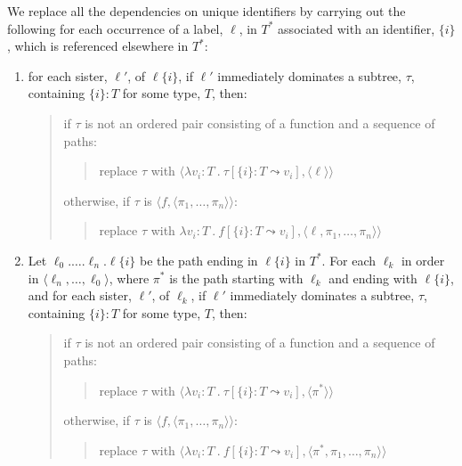 We replace all the dependencies on
unique identifiers by carrying out the
following for each occurrence of a label, $\ell$, in $T^*$ associated with
an identifier, $\{i\}$, which is referenced elsewhere in $T^*$:
\begin{enumerate} 
 
\item for each sister, $\ell'$, of $\ell\{i\}$, if $\ell'$ immediately
  dominates
  a subtree, $\tau$, containing $\{i\}\!:\!T$ for some type, $T$, then:
\begin{quote}
if $\tau$ is not an ordered pair consisting of a function and a
sequence of paths:
\begin{quote}
replace $\tau$ with $\langle\lambda v_i\!:\!T\ .\ \tau[\{i\}\!:\!T\leadsto v_i],\langle\ell\rangle\rangle$
\end{quote}
otherwise, if $\tau$ is $\langle f, \langle\pi_1,\ldots,\pi_n\rangle\rangle$:
\begin{quote}
replace $\tau$ with $\lambda v_i\!:\!T\ . \ f[\{i\}\!:\!T\leadsto v_i],
\langle\ell,\pi_1,\ldots,\pi_n\rangle\rangle$
\end{quote}
\end{quote}
 
\item Let $\ell_0.\ldots.\ell_n.\ell\{i\}$ be the path ending in
  $\ell\{i\}$ in $T^*$.  For each $\ell_k$ in order in
  $\langle\ell_n,\ldots,\ell_0\rangle$, where $\pi^*$ is the path starting
  with $\ell_k$ and ending with $\ell\{i\}$, and for each sister,
  $\ell'$, of $\ell_k$, if $\ell'$ immediately dominates a subtree,
  $\tau$, containing $\{i\}\!:\!T$ for some type, $T$, then:
 \begin{quote}
if $\tau$ is not an ordered pair consisting of a function and a
sequence of paths:
\begin{quote}
replace $\tau$ with $\langle\lambda v_i\!:\!T\ .\ \tau[\{i\}\!:\!T\leadsto v_i],\langle\pi^*\rangle\rangle$
\end{quote}
otherwise, if $\tau$ is $\langle f, \langle\pi_1,\ldots,\pi_n\rangle\rangle$:
\begin{quote}
replace $\tau$ with $\langle\lambda v_i\!:\!T\ . \ f[\{i\}\!:\!T\leadsto v_i],
\langle\pi^*,\pi_1,\ldots,\pi_n\rangle\rangle$
\end{quote}
\end{quote}
 
\end{enumerate} 
   

